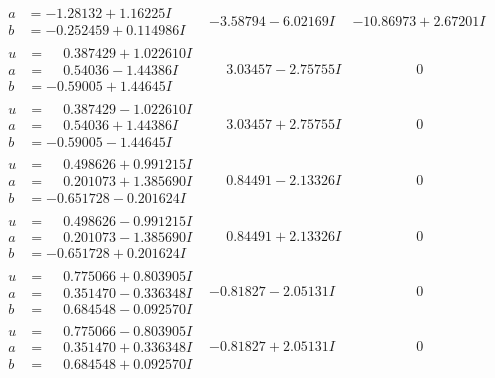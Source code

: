 \documentclass[1p]{elsarticle_modified}
\theoremstyle{definition}
\begin{document}
$$\begin{array}{c|c|c}
\begin{aligned}
a &= -1.28132 + 1.16225 I \\
b &= -0.252459 + 0.114986 I\end{aligned}
 & -3.58794 - 6.02169 I & -10.86973 + 2.67201 I \\ \hline\begin{aligned}
u &= \phantom{-}0.387429 + 1.022610 I \\
a &= \phantom{-}0.54036 - 1.44386 I \\
b &= -0.59005 + 1.44645 I\end{aligned}
 & \phantom{-}3.03457 - 2.75755 I & \phantom{-0.000000 } 0 \\ \hline\begin{aligned}
u &= \phantom{-}0.387429 - 1.022610 I \\
a &= \phantom{-}0.54036 + 1.44386 I \\
b &= -0.59005 - 1.44645 I\end{aligned}
 & \phantom{-}3.03457 + 2.75755 I & \phantom{-0.000000 } 0 \\ \hline\begin{aligned}
u &= \phantom{-}0.498626 + 0.991215 I \\
a &= \phantom{-}0.201073 + 1.385690 I \\
b &= -0.651728 - 0.201624 I\end{aligned}
 & \phantom{-}0.84491 - 2.13326 I & \phantom{-0.000000 } 0 \\ \hline\begin{aligned}
u &= \phantom{-}0.498626 - 0.991215 I \\
a &= \phantom{-}0.201073 - 1.385690 I \\
b &= -0.651728 + 0.201624 I\end{aligned}
 & \phantom{-}0.84491 + 2.13326 I & \phantom{-0.000000 } 0 \\ \hline\begin{aligned}
u &= \phantom{-}0.775066 + 0.803905 I \\
a &= \phantom{-}0.351470 - 0.336348 I \\
b &= \phantom{-}0.684548 - 0.092570 I\end{aligned}
 & -0.81827 - 2.05131 I & \phantom{-0.000000 } 0 \\ \hline\begin{aligned}
u &= \phantom{-}0.775066 - 0.803905 I \\
a &= \phantom{-}0.351470 + 0.336348 I \\
b &= \phantom{-}0.684548 + 0.092570 I\end{aligned}
 & -0.81827 + 2.05131 I & \phantom{-0.000000 } 0 \\ \hline\begin{aligned}

\end{aligned}
\end{array}$$
\end{document}
